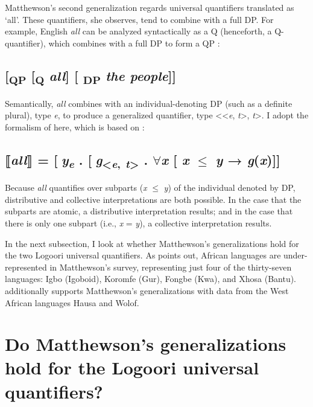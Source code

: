 \documentclass[output=paper]{langsci/langscibook}
\begin{document}
  Matthewson's second generalization regards universal quantifiers translated as ‘all’. These quantifiers, she observes, tend to combine with a full DP. For example, English \textit{all} can be analyzed syntactically as a Q (henceforth, a Q-quantifier), which combines with a full DP to form a QP \citep{Matthewson2001}:  

\subsection{      [\textsubscript{QP} [\textsubscript{Q} \textit{all}] [\textsubscript{ DP} \textit{the people}]]}

Semantically, \textit{all} combines with an individual-denoting DP (such as a definite plural), type \textit{e}, to produce a generalized quantifier, type <<\textit{e},\textit{ t}>, \textit{t}>. I adopt the formalism of \citet{Zimmermann2014} here, which is based on \citet{Matthewson2001}:

\subsection{⟦\textit{all}⟧ = [\textit{y}\textit{\textsubscript{e}} . [\textit{g}\textsubscript{<}\textit{\textsubscript{e}}\textsubscript{,} \textit{\textsubscript{t}}\textsubscript{>} . ${\forall}$\textit{x} [ \textit{x} ${\leq}$\textit{ y} → \textit{g}(\textit{x})]]}

Because \textit{all} quantifies over subparts (\textit{x} ${\leq}$ \textit{y}) of the individual denoted by DP, distributive and collective interpretations are both possible. In the case that the subparts are atomic, a distributive interpretation results; and in the case that there is only one subpart (i.e., \textit{x} = \textit{y}), a collective interpretation results.

  In the next subsection, I look at whether Matthewson's generalizations hold for the two Logoori universal quantifiers. As \citet{Zimmermann2014} points out, African languages are under-represented in Matthewson's survey, representing just four of the thirty-seven languages: Igbo (Igoboid), Koromfe (Gur), Fongbe (Kwa), and Xhosa (Bantu). \citet{Zimmermann2014} additionally supports Matthewson's generalizations with data from the West African languages Hausa \citep{Zimmermann2013} and Wolof.

\section{Do Matthewson's generalizations hold for the Logoori universal quantifiers?}
\end{document}
